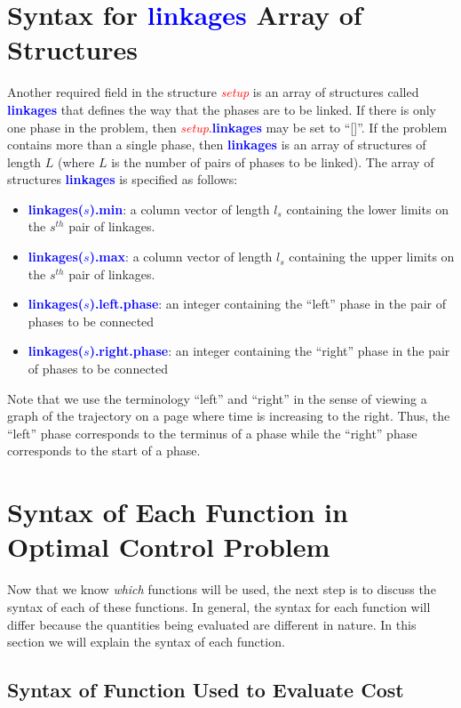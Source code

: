 \documentclass[10pt,final]{report}
\newcommand{\bfblue}[1]{\textcolor{blue}{\bf #1}}
\newcommand{\slred}[1]{\textcolor{red}{\sl #1}}
\begin{document}
\section{Syntax for \bfblue{linkages} Array of Structures \label{sect: linkages}}

Another required field in the structure \slred{setup} is an array of
structures called \bfblue{linkages} that defines the way that the
phases are to be linked.  If there is only one phase in the problem, then
\slred{setup}.\bfblue{linkages} may be set to ``[]''.  If the problem
contains more than a single phase, then \bfblue{linkages} is an array
of structures of length $L$ (where $L$ is the number of pairs of phases
to be linked).  The array of structures \bfblue{linkages} is specified
as follows:
\begin{itemize}
\item \bfblue{linkages($s$).min}: a column vector of length $l_s$
  containing the lower limits on the $s^{th}$ pair of linkages.
\item \bfblue{linkages($s$).max}: a column vector of length $l_s$
  containing the upper limits on the $s^{th}$ pair of linkages.
\item \bfblue{linkages($s$).left.phase}: an integer containing the
  ``left'' phase in the pair of phases to be connected
\item \bfblue{linkages($s$).right.phase}: an integer containing the
  ``right'' phase in the pair of phases to be connected
\end{itemize}
Note that we use the terminology ``left'' and ``right'' in the sense
of viewing a graph of the trajectory on a page where time is
increasing to the right.  Thus, the ``left'' phase corresponds to the
terminus of a phase while the ``right'' phase corresponds to the
start of a phase.

\section{Syntax of Each Function in Optimal Control Problem}

Now that we know {\em which} functions will be used, the next step is to
discuss the syntax of each of these functions.  In general, the syntax for
each function will differ because the quantities being evaluated are different
in nature.  In this section we will explain the syntax of each function.

\subsection{Syntax of Function Used to Evaluate Cost}\label{sect:_Cost_syntax}
\end{document}
